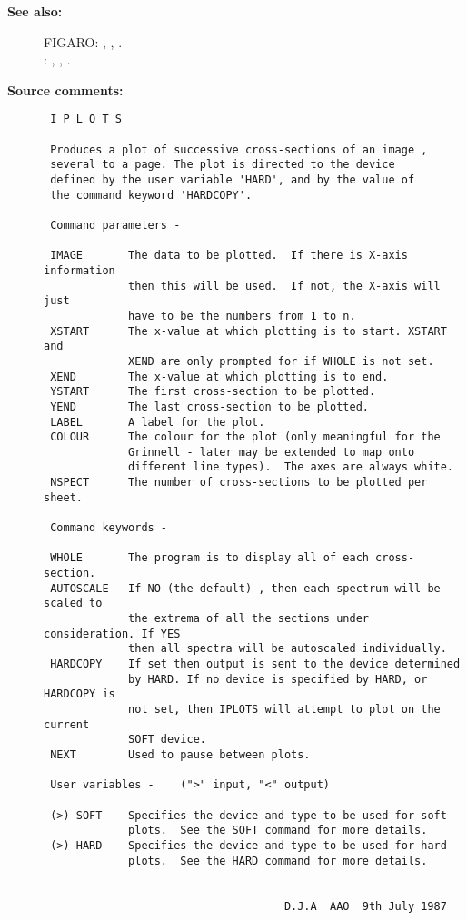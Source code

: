\begin{description}
\item [{\bf See also:}]
FIGARO: , , .\\
: , , .\\

\item [{\bf Source comments:}]
\begin{verbatim}
 I P L O T S

 Produces a plot of successive cross-sections of an image ,
 several to a page. The plot is directed to the device
 defined by the user variable 'HARD', and by the value of
 the command keyword 'HARDCOPY'.

 Command parameters -

 IMAGE       The data to be plotted.  If there is X-axis information
             then this will be used.  If not, the X-axis will just
             have to be the numbers from 1 to n.
 XSTART      The x-value at which plotting is to start. XSTART and
             XEND are only prompted for if WHOLE is not set.
 XEND        The x-value at which plotting is to end.
 YSTART      The first cross-section to be plotted.
 YEND        The last cross-section to be plotted.
 LABEL       A label for the plot.
 COLOUR      The colour for the plot (only meaningful for the
             Grinnell - later may be extended to map onto
             different line types).  The axes are always white.
 NSPECT      The number of cross-sections to be plotted per sheet.

 Command keywords -

 WHOLE       The program is to display all of each cross-section.
 AUTOSCALE   If NO (the default) , then each spectrum will be scaled to
             the extrema of all the sections under consideration. If YES
             then all spectra will be autoscaled individually.
 HARDCOPY    If set then output is sent to the device determined
             by HARD. If no device is specified by HARD, or HARDCOPY is
             not set, then IPLOTS will attempt to plot on the current
             SOFT device.
 NEXT        Used to pause between plots.

 User variables -    (">" input, "<" output)

 (>) SOFT    Specifies the device and type to be used for soft
             plots.  See the SOFT command for more details.
 (>) HARD    Specifies the device and type to be used for hard
             plots.  See the HARD command for more details.


                                     D.J.A  AAO  9th July 1987
\end{verbatim}
\end{description}
